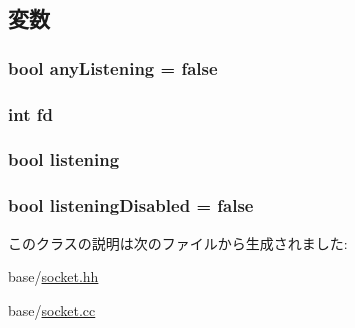 \subsection{変数}
\hypertarget{classListenSocket_aebef6e518aa8b11bc3b9b850cb6051a6}{
\subsubsection[{anyListening}]{\setlength{\rightskip}{0pt plus 5cm}bool {\bf anyListening} = false}}
\label{classListenSocket_aebef6e518aa8b11bc3b9b850cb6051a6}
\hypertarget{classListenSocket_a6f8059414f0228f0256115e024eeed4b}{
\subsubsection[{fd}]{\setlength{\rightskip}{0pt plus 5cm}int {\bf fd}}}
\label{classListenSocket_a6f8059414f0228f0256115e024eeed4b}
\hypertarget{classListenSocket_a3e57a9a7cb30c699695affc832678a57}{
\subsubsection[{listening}]{\setlength{\rightskip}{0pt plus 5cm}bool {\bf listening}}}
\label{classListenSocket_a3e57a9a7cb30c699695affc832678a57}
\hypertarget{classListenSocket_a14090a905e7feb385e20d56ab2941384}{
\subsubsection[{listeningDisabled}]{\setlength{\rightskip}{0pt plus 5cm}bool {\bf listeningDisabled} = false}}
\label{classListenSocket_a14090a905e7feb385e20d56ab2941384}


このクラスの説明は次のファイルから生成されました:\begin{DoxyCompactItemize}
\item 
base/\hyperlink{socket_8hh}{socket.hh}\item 
base/\hyperlink{socket_8cc}{socket.cc}\end{DoxyCompactItemize}
